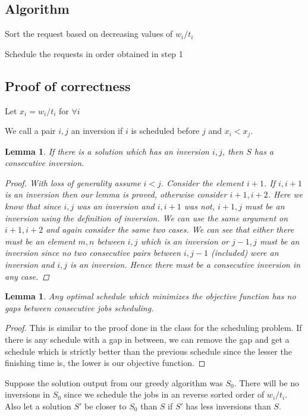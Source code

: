 \documentclass[12pt]{article}
\newtheorem{lemma}[theorem]{Lemma}
\begin{document}
\subsection{Algorithm}

  \begin{algorithmic}[1]
	\item Sort the request based on decreasing values of  $w_i/t_i$
	\item Schedule the requests in order obtained in step 1
  \end{algorithmic}

\subsection{Proof of correctness}

Let $x_i = w_i / t_i$ for $\forall i$

We call a pair $i,j$ an inversion if $i$ is scheduled before $j$ and $x_i < x_j$. 

\begin{lemma} If there is a solution which has an inversion $i,j$, then $S$ has a consecutive inversion.
\begin{proof}
With loss of generality assume $i < j$. Consider the element $i+1$. If $i,i+1$ is an inversion then our lemma is proved, otherwise consider $i+1, i+2$. Here we know that since $i,j$ was an inversion and $i,i+1$ was not, $i+1, j$ must be an inversion using the definition of inversion. We can use the same argument on $i+1, i+2$ and again consider the same two cases. We can see that either there must be an element $m,n$ between $i,j$ which is an inversion or $j-1,j$ must be an inversion since no two consecutive pairs between $i,j-1$ (included) were an inversion and $i,j$ is an inversion. Hence there must be a consecutive inversion in any case.
\end{proof}
\end{lemma}
\begin{lemma}
Any optimal schedule which minimizes the objective function has no gaps between consecutive jobs scheduling.
\end{lemma}
\begin{proof} This is similar to the proof done in the class for the scheduling problem. If there is any schedule with a gap in between, we can remove the gap and get a schedule which is strictly better than the previous schedule since the lesser the finishing time is, the lower is our objective function.
\end{proof}
Suppose the solution output from our greedy algorithm was $S_0$. There will be no inversions in $S_0$ since we schedule the jobs in an reverse sorted order of $w_i/t_i$. Also let a solution $S'$ be closer to $S_0$ than $S$ if $S'$ has less inversions than $S$.
\end{document}
